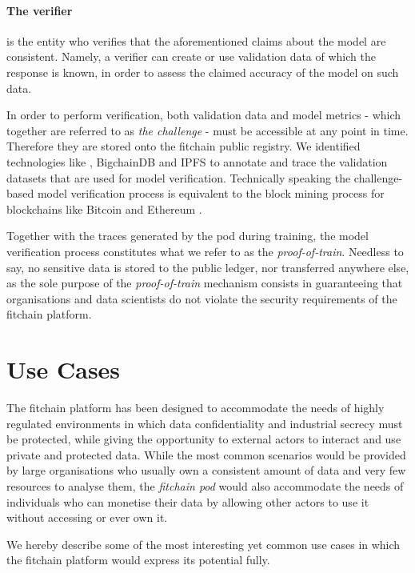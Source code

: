 \documentclass[12pt, a4paper,titlepage]{extreport}
\begin{document}
\paragraph{The verifier} is the entity who verifies that the aforementioned claims about the model are consistent. Namely, a verifier can create or use validation data of which the response is known, in order to assess the claimed accuracy of the model on such data. 

In order to perform verification, both validation data and model metrics - which together are referred to as \textit{the challenge} - must be accessible at any point in time. Therefore they are stored onto the fitchain public registry. We identified technologies like \cite{oceanprotocol}, BigchainDB \cite{bigchaindb} and IPFS \cite{ipfs} to annotate and trace the validation datasets that are used for model verification.
Technically speaking the challenge-based model verification process is equivalent to the block mining process for blockchains like Bitcoin \cite{bitcoin} and Ethereum \cite{ethereum}.
 
Together with the traces generated by the pod during training, the model verification process constitutes what we refer to as the \textit{proof-of-train}. Needless to say, no sensitive data is stored to the public ledger, nor transferred anywhere else, as the sole purpose of the \textit{proof-of-train} mechanism consists in guaranteeing that organisations and data scientists do not violate the security requirements of the fitchain platform.


\section{Use Cases}
The fitchain platform has been designed to accommodate the needs of highly regulated environments in which data confidentiality and industrial secrecy must be protected, while giving the opportunity to external actors to interact and use private and protected data. While the most common scenarios would be provided by large organisations who usually own a consistent amount of data and very few resources to analyse them, the \textit{fitchain pod} would also accommodate the needs of individuals who can monetise their data by allowing other actors to use it without accessing or ever own it. 

We hereby describe some of the most interesting yet common use cases in which the fitchain platform would express its potential fully.
\end{document}
